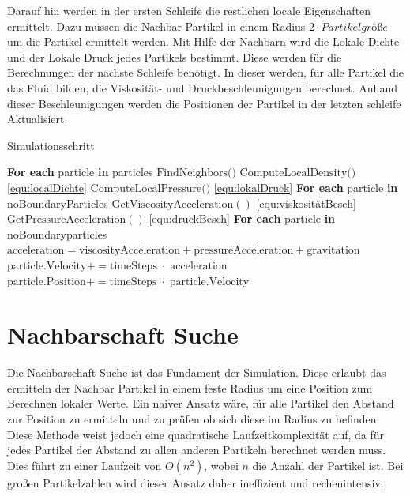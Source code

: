 \documentclass[a4paper, 12pt]{article}
\begin{document}
Darauf hin werden in der ersten Schleife die restlichen locale Eigenschaften ermittelt. Dazu müssen die Nachbar Partikel in einem Radius $2 \cdot Partikelgröße$ um die Partikel ermittelt werden. Mit Hilfe der Nachbarn wird die Lokale Dichte und der Lokale Druck jedes Partikels bestimmt. Diese werden für die Berechnungen der nächste Schleife benötigt. In dieser werden, für alle Partikel die das Fluid bilden, die Viskosität- und Druckbeschleunigungen berechnet.
Anhand dieser Beschleunigungen werden die Positionen der Partikel in der letzten schleife Aktualisiert. 

\begin{algorithm}[H]
\caption{Simulationsschritt}
\begin{algorithmic}[1]
\State \textbf{For each} particle \textbf{in} particles
\State \quad $\text{FindNeighbors()}$
\State \quad $\text{ComputeLocalDensity()}$ \hfill \eqref{equ:localDichte}
\State \quad $\text{ComputeLocalPressure()}$ \hfill \eqref{equ:lokalDruck}
\vspace{1em}
\State \textbf{For each} particle \textbf{in} noBoundaryParticles
\State \quad $\text{GetViscosityAcceleration}()$ \hfill \eqref{equ:viskositätBesch}
\State \quad $\text{GetPressureAcceleration}()$ \hfill \eqref{equ:druckBesch}
\vspace{1em}
\State \textbf{For each} particle \textbf{in} noBoundaryparticles
\State \quad $\text{acceleration} = \text{viscosityAcceleration} + \text{pressureAcceleration} + \text{gravitation}$
\State \quad $\text{particle.Velocity} += \text{timeSteps}\;\cdot\;\text{acceleration}$
\State \quad $\text{particle.Position} += \text{timeSteps}\;\cdot\;\text{particle.Velocity}$
\end{algorithmic}
\end{algorithm}

\section{Nachbarschaft Suche} \label{section_4}
Die Nachbarschaft Suche ist das Fundament der Simulation. Diese erlaubt das ermitteln der Nachbar Partikel in einem feste Radius um eine Position zum Berechnen lokaler Werte. Ein naiver Ansatz wäre, für alle Partikel den Abstand zur Position zu ermitteln und zu prüfen ob sich diese im Radius zu befinden. Diese Methode weist jedoch eine quadratische Laufzeitkomplexität auf, da für jedes Partikel der Abstand zu allen anderen Partikeln berechnet werden muss. Dies führt zu einer Laufzeit von $O(n^2)$, wobei $n$ die Anzahl der Partikel ist. Bei großen Partikelzahlen wird dieser Ansatz daher ineffizient und rechenintensiv.
\end{document}
